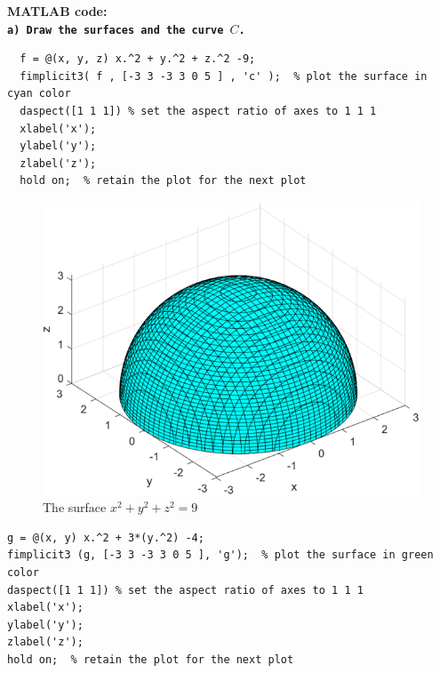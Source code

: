 \vspace*{1cm}

\textbf{MATLAB code: }\\
\textbf{\texttt{a) Draw the surfaces and the curve $C$.} }

\begin{lstlisting}[style=Matlab-editor]
  % Plot the the surface x^2 + y^2 + z^2 = 9
  f = @(x, y, z) x.^2 + y.^2 + z.^2 -9;
  fimplicit3( f , [-3 3 -3 3 0 5 ] , 'c' );  % plot the surface in cyan color
  daspect([1 1 1]) % set the aspect ratio of axes to 1 1 1
  xlabel('x');
  ylabel('y');
  zlabel('z');
  hold on;  % retain the plot for the next plot  
\end{lstlisting}

\begin{figure}[H]
  \centering
  \includegraphics[width=12cm]{graphics/3a1.png}
  \caption{The surface $x^2 + y^2 + z^2 = 9$}
\end{figure}

\begin{lstlisting}[style=Matlab-editor]
% Plot the surface x^2 +3y^2 = 4
g = @(x, y) x.^2 + 3*(y.^2) -4;
fimplicit3 (g, [-3 3 -3 3 0 5 ], 'g');  % plot the surface in green color
daspect([1 1 1]) % set the aspect ratio of axes to 1 1 1
xlabel('x');
ylabel('y');
zlabel('z');
hold on;  % retain the plot for the next plot
\end{lstlisting}


